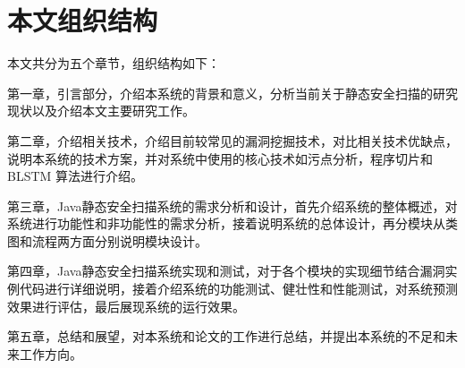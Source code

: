 \section{本文组织结构}
本文共分为五个章节，组织结构如下：

第一章，引言部分，介绍本系统的背景和意义，分析当前关于静态安全扫描的研究现状以及介绍本文主要研究工作。

第二章，介绍相关技术，介绍目前较常见的漏洞挖掘技术，对比相关技术优缺点，说明本系统的技术方案，并对系统中使用的核心技术如污点分析，程序切片和 BLSTM 算法进行介绍。

第三章，Java静态安全扫描系统的需求分析和设计，首先介绍系统的整体概述，对系统进行功能性和非功能性的需求分析，接着说明系统的总体设计，再分模块从类图和流程两方面分别说明模块设计。

第四章，Java静态安全扫描系统实现和测试，对于各个模块的实现细节结合漏洞实例代码进行详细说明，接着介绍系统的功能测试、健壮性和性能测试，对系统预测效果进行评估，最后展现系统的运行效果。

第五章，总结和展望，对本系统和论文的工作进行总结，并提出本系统的不足和未来工作方向。